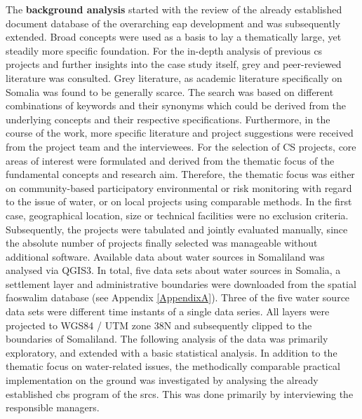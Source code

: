 The \textbf{background analysis} started with the review of the already established document database of the overarching \acrshort{eap} development and was subsequently extended. Broad concepts were used as a basis to lay a thematically large, yet steadily more specific foundation. For the in-depth analysis of previous \acrshort{cs} projects and further insights into the case study itself, grey and peer-reviewed literature was consulted. Grey literature, as academic literature specifically on Somalia was found to be generally scarce. The search was based on different combinations of keywords and their synonyms which could be derived from the underlying concepts and their respective specifications. Furthermore, in the course of the work, more specific literature and project suggestions were received from the project team and the interviewees. For the selection of CS projects, core areas of interest were formulated and derived from the thematic focus of the fundamental concepts and research aim. Therefore, the thematic focus was either on community-based participatory environmental or risk monitoring with regard to the issue of water, or on local projects using comparable methods. In the first case, geographical location, size or technical facilities were no exclusion criteria. Subsequently, the projects were tabulated and jointly evaluated manually, since the absolute number of projects finally selected was manageable without additional software.\newline
Available data about water sources in Somaliland was analysed via QGIS3. In total, five data sets about water sources in Somalia, a settlement layer and administrative boundaries were downloaded from the spatial \acrshort{fao}\acrshort{swalim} database (see Appendix \ref{AppendixA}). Three of the five water source data sets were different time instants of a single data series. All layers were projected to WGS84 / UTM zone 38N and subsequently clipped to the boundaries of Somaliland. The following analysis of the data was primarily exploratory, and extended with a basic statistical analysis.\newline 
In addition to the thematic focus on water-related issues, the methodically comparable practical implementation on the ground was investigated by analysing the already established \acrshort{cbs} program of the \acrshort{srcs}. This was done primarily by interviewing the responsible managers.

